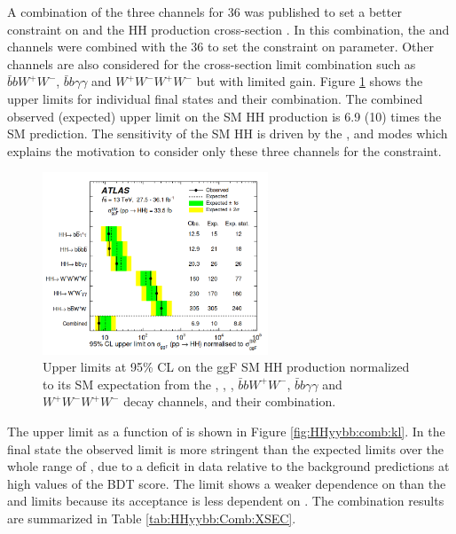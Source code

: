 A combination of the three channels for 36 \ifb was published to set a better constraint on \kl and the HH production cross-section \cite{HH_Comb_36}. In this combination, the \bbbb and \bbtt channels were combined with the 36 \ifb \bbyy to set the constraint on \kl parameter. Other channels are also considered for the cross-section limit combination such as $\bar{b}bW^+W^-$, $\bar{b}b\gamma\gamma$ and $W^+W^-W^+W^-$ but with limited gain. Figure \ref{fig:HHyybb:comb:xsec} shows the upper limits for individual final states and their combination. The combined observed (expected) upper limit on the SM HH production is 6.9 (10) times the SM prediction. The sensitivity of the SM HH is driven by the \bbbb, \bbtt and \bbyy modes which explains the motivation to consider only these three channels for the \kl constraint. 
\begin{figure}[htbp]
    \centering
    \includegraphics[width=0.6\textwidth]{Ch1/Img/XSec_Comb_36.png}
    \caption{Upper limits at 95\% CL on the ggF SM HH production normalized to its SM expectation from the \bbtt, \bbbb, \bbyy, $\bar{b}bW^+W^-$, $\bar{b}b\gamma\gamma$ and $W^+W^-W^+W^-$ decay channels, and their combination.}
    \label{fig:HHyybb:comb:xsec}
\end{figure}

The upper limit as a function of \kl is shown in Figure \ref{fig:HHyybb:comb:kl}. In the \bbtt final state the observed limit is more stringent than the expected limits over the whole range of \kl, due to a deficit in data relative to the background predictions at high values of the BDT score. The \bbyy limit shows a weaker dependence on \kl than the \bbbb and \bbtt limits because its acceptance is less dependent on \kl. The combination results are summarized in Table \ref{tab:HHyybb:Comb:XSEC}.


